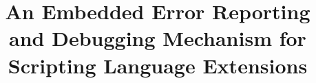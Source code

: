 
\setlength{\textheight}{9.0in}
\setlength{\columnsep}{0.25in}
\setlength{\textwidth}{6.45in}
\setlength{\footheight}{0.0in}
\setlength{\topmargin}{0.0in}
\setlength{\headheight}{0.0in}
\setlength{\headsep}{0.0in}
\setlength{\oddsidemargin}{0in}


\makeatletter
\def\@normalsize{\@setsize\normalsize{12pt}\xpt\@xpt
\abovedisplayskip 10pt plus2pt minus5pt\belowdisplayskip \abovedisplayskip
\abovedisplayshortskip \z@ plus3pt\belowdisplayshortskip 6pt plus3pt
minus3pt\let\@listi\@listI} 

\def\subsize{\@setsize\subsize{12pt}\xipt\@xipt}

\def\section{\@startsection {section}{1}{\z@}{24pt plus 2pt minus 2pt}
{12pt plus 2pt minus 2pt}{\large\bf}}

\def\subsection{\@startsection {subsection}{2}{\z@}{12pt plus 2pt minus 2pt}
{12pt plus 2pt minus 2pt}{\subsize\bf}}
\makeatother

\newcommand{\ignore}[1]{}



\date{}

\title{\Large \bf   An Embedded Error Reporting and Debugging Mechanism for Scripting Language Extensions}

